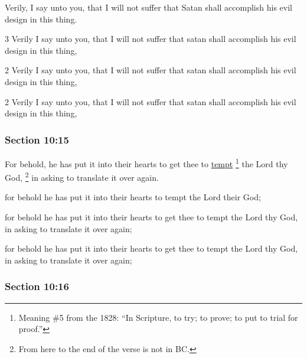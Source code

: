 		Verily, I say unto you, that I will not suffer that Satan shall accomplish his evil design in this thing.

		\begin{framed}
		\scriptsize
			\begin{compactdesc}
				\item[JSP] 3 Verily I say unto you, that I will not suffer that satan shall accomplish his evil design in this thing,
				\item[RB1] [\textit{missing}] 
				\item[DC 1835] 2 Verily I say unto you, that I will not suffer that satan shall accomplish his evil design in this thing,
				\item[DC 1844] 2 Verily I say unto you, that I will not suffer that satan shall accomplish his evil design in this thing,
			\end{compactdesc}
		\end{framed}

	\subsubsection{Section 10:15} %
		\label{DC10-15}

		For behold, he has put it into their hearts to get thee to \hyperref[TEMPTATION]{tempt}%
			\footnote{%
				Meaning \#5 from the 1828: ``In Scripture, to try; to prove; to put to trial for proof.''
				}
		the Lord thy God,
			\footnote{%
				From here to the end of the verse is not in BC.
				}%
		in asking to translate it over again.

		\begin{framed}
		\scriptsize
			\begin{compactdesc}
				\item[JSP] for behold he has put it into their hearts to tempt the Lord their God;
				\item[RB1] [\textit{missing}] 
				\item[DC 1835] for behold he has put it into their hearts to get thee to tempt the Lord thy God, in asking to translate it over again;
				\item[DC 1844] for behold he has put it into their hearts to get thee to tempt the Lord thy God, in asking to translate it over again; 
			\end{compactdesc}
		\end{framed}

	\subsubsection{Section 10:16} %
		\label{DC10-16}


